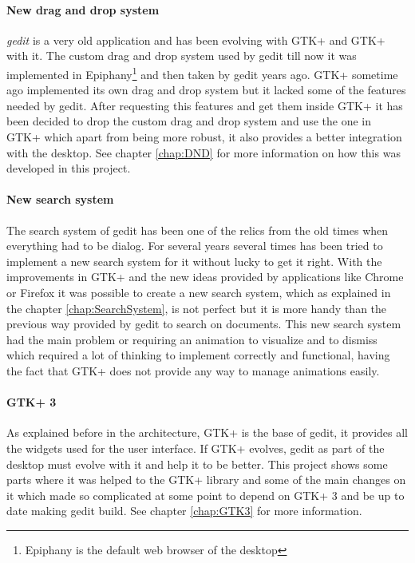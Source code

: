\paragraph{New drag and drop system}

\emph{gedit} is a very old application and has been evolving with GTK+ and GTK+
with it. The custom drag and drop system used by gedit till now it was implemented 
in Epiphany\footnote{Epiphany is the default web browser of the \GNOME desktop} 
and then taken by gedit years ago. GTK+ sometime ago implemented its own drag 
and drop system but it lacked some of the features needed by gedit. After requesting 
this features and get them inside GTK+ it has been decided to drop the custom 
drag and drop system and use the one in GTK+ which apart from being more robust, 
it also provides a better integration with the desktop. See chapter \ref{chap:DND}
for more information on how this was developed in this project.

\paragraph{New search system}

The search system of gedit has been one of the relics from the old times when 
everything had to be dialog. For several years several times has been tried to 
implement a new search system for it without lucky to get it right. With the 
improvements in GTK+ and the new ideas provided by applications like Chrome or 
Firefox it was possible to create a new search system, which as explained in the 
chapter \ref{chap:SearchSystem}, is not perfect but it is more handy than the
previous way provided by gedit to search on documents. This new search system 
had the main problem or requiring an animation to visualize and to dismiss which 
required a lot of thinking to implement correctly and functional, having the fact 
that GTK+ does not provide any way to manage animations easily.

\paragraph{GTK+ 3}

As explained before in the architecture, GTK+ is the base of gedit, it provides 
all the widgets used for the user interface. If GTK+ evolves, gedit as part of 
the \GNOME desktop must evolve with it and help it to be better. This project 
shows some parts where it was helped to the GTK+ library and some of the main 
changes on it which made so complicated at some point to depend on GTK+ 3 and be 
up to date making gedit build. See chapter \ref{chap:GTK3} for more information.

